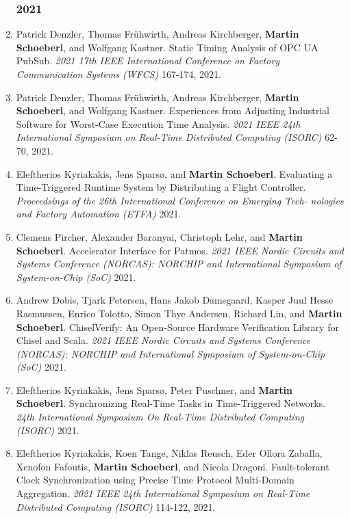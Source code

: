 \begin{enumerate}

\subsubsection*{2021}

\item Patrick Denzler, Thomas Fr\"uhwirth, Andreas Kirchberger, {\bf Martin Schoeberl}, and Wolfgang Kastner.
 Static Timing Analysis of OPC UA PubSub.
 \emph{2021 17th IEEE International Conference on Factory Communication Systems (WFCS)} 167-174, 2021.

\item Patrick Denzler, Thomas Fr\"uhwirth, Andreas Kirchberger, {\bf Martin Schoeberl}, and Wolfgang Kastner.
 Experiences from Adjusting Industrial Software for Worst-Case Execution Time Analysis.
 \emph{2021 IEEE 24th International Symposium on Real-Time Distributed Computing (ISORC)} 62-70, 2021.

\item Eleftherios Kyriakakis, Jens Spars{\o}, and {\bf Martin Schoeberl}.
 Evaluating a Time-Triggered Runtime System by Distributing a Flight Controller.
 \emph{Proceedsings of the 26th International Conference on Emerging Tech- nologies and Factory Automation (ETFA)} 2021.

\item Clemens Pircher, Alexander Baranyai, Christoph Lehr, and {\bf Martin Schoeberl}.
 Accelerator Interface for Patmos.
 \emph{2021 IEEE Nordic Circuits and Systems Conference (NORCAS): NORCHIP and International Symposium of System-on-Chip (SoC)} 2021.

\item Andrew Dobis, Tjark Petersen, Hans Jakob Damsgaard, Kasper Juul Hesse Rasmussen, Enrico Tolotto, Simon Thye Andersen, Richard Lin, and {\bf Martin Schoeberl}.
 ChiselVerify: An Open-Source Hardware Verification Library for Chisel and Scala.
 \emph{2021 IEEE Nordic Circuits and Systems Conference (NORCAS): NORCHIP and International Symposium of System-on-Chip (SoC)} 2021.

\item Eleftherios Kyriakakis, Jens Spars{\o}, Peter Puschner, and {\bf Martin Schoeberl}.
 Synchronizing Real-Time Tasks in Time-Triggered Networks.
 \emph{24th International Symposium On Real-Time Distributed Computing (ISORC)} 2021.

\item Eleftherios Kyriakakis, Koen Tange, Niklas Reusch, Eder Ollora Zaballa, Xenofon Fafoutis, {\bf Martin Schoeberl}, and Nicola Dragoni.
 Fault-tolerant Clock Synchronization using Precise Time Protocol Multi-Domain Aggregation.
 \emph{2021 IEEE 24th International Symposium on Real-Time Distributed Computing (ISORC)} 114-122, 2021.


\end{enumerate}
